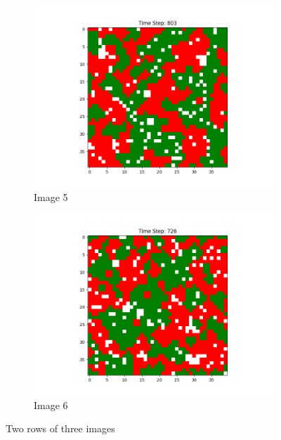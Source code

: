 \documentclass[12pt]{article}
\begin{document}
\begin{figure}[h]
\begin{subfigure}{0.2\textwidth}
			\includegraphics[width=\linewidth]{final_cluster_w10b20.png}
			\caption{Image 5}
		\end{subfigure}\hspace{0.02\textwidth}
		\begin{subfigure}{0.2\textwidth}
			\includegraphics[width=\linewidth]{final_cluster_w20b20.png}
			\caption{Image 6}
		\end{subfigure}
		
		\caption{Two rows of three images}
	\end{figure}
	
\end{document}
